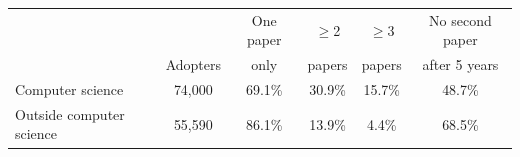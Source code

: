 \begin{tabular}{lccccc}
\toprule
 & & One paper & $\geq$2 & $\geq$3 & No second paper \\
 & Adopters & only & papers & papers & after 5 years \\
\midrule
Computer science & 74,000 & 69.1\% & 30.9\% & 15.7\% & 48.7\% \\
Outside computer science & 55,590 & 86.1\% & 13.9\% & 4.4\% & 68.5\% \\
\bottomrule
\end{tabular}

